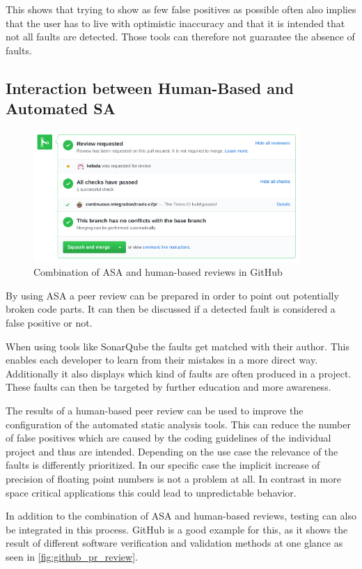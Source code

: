 \documentclass{scrartcl}
\begin{document}
This shows that trying to show as few false positives as possible often also implies that the user has to live with optimistic inaccuracy and that it is intended that not all faults are detected. Those tools can therefore not guarantee the absence of faults.

\subsection{Interaction between Human-Based and Automated SA}

\begin{figure}[h]
	\centering
	\includegraphics[width=0.9\textwidth]{img/github_pr_review}
	\caption[GitHub PR review]{Combination of ASA and human-based reviews in GitHub}
	\label{fig:github_pr_review}
\end{figure}

By using ASA a peer review can be prepared in order to point out potentially broken code parts. It can then be discussed if a detected fault is considered a false positive or not.

When using tools like SonarQube the faults get matched with their author. This enables each developer to learn from their mistakes in a more direct way. Additionally it also displays which kind of faults are often produced in a project. These faults can then be targeted by further education and more awareness.

The results of a human-based peer review can be used to improve the configuration of the automated static analysis tools. This can reduce the number of false positives which are caused by the coding guidelines of the individual project and thus are intended.
Depending on the use case the relevance of the faults is differently prioritized. In our specific case the implicit increase of precision of floating point numbers is not a problem at all. In contrast in more space critical applications this could lead to unpredictable behavior.

In addition to the combination of ASA and human-based reviews, testing can also be integrated in this process. GitHub is a good example for this, as it shows the result of different software verification and validation methods at one glance as seen in \vref{fig:github_pr_review}.
\end{document}
